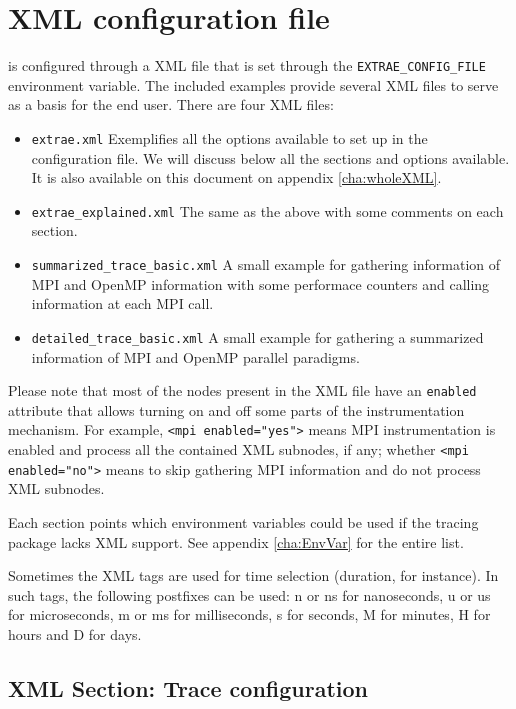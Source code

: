 \chapter{\TRACE XML configuration file}\label{cha:XML}

\TRACE is configured through a XML file that is set through the {\tt EXTRAE\_CONFIG\_FILE} environment variable. The included examples provide several XML files to serve as a basis for the end user. There are four XML files:
\begin{itemize}
 \item {\tt extrae.xml} Exemplifies all the options available to set up in the configuration file. We will discuss below all the sections and options available. It is also available on this document on appendix \ref{cha:wholeXML}.
 \item {\tt extrae\_explained.xml} The same as the above with some comments on each section.
 \item {\tt summarized\_trace\_basic.xml} A small example for gathering information of MPI and OpenMP information with some performace counters and calling information at each MPI call.
 \item {\tt detailed\_trace\_basic.xml} A small example for gathering a summarized information of MPI and OpenMP parallel paradigms.
\end{itemize}

Please note that most of the nodes present in the XML file have an {\tt enabled} attribute that allows turning on and off some parts of the instrumentation mechanism. For example, {\tt <mpi enabled="yes">} means MPI instrumentation is enabled and process all the contained XML subnodes, if any; whether {\tt <mpi enabled="no">} means to skip gathering MPI information and do not process XML subnodes.

Each section points which environment variables could be used if the tracing package lacks XML support. See appendix \ref{cha:EnvVar} for the entire list.

Sometimes the XML tags are used for time selection (duration, for instance). In such tags, the following postfixes can be used: n or ns for nanoseconds, u or us for microseconds, m or ms for milliseconds, s for seconds, M for minutes, H for hours and D for days.

\section{XML Section: Trace configuration}\label{sec:XMLSectionTraceConfiguration}

